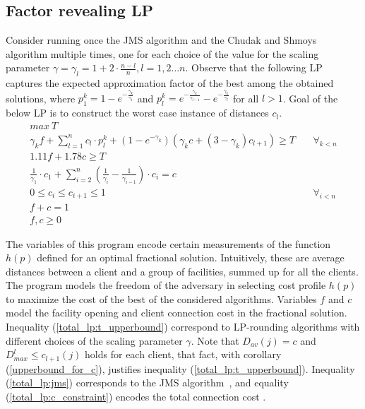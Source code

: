 \documentclass{llncs}
\begin{document}
 \subsection{Factor revealing LP}
 Consider running once the JMS algorithm and the Chudak and Shmoys algorithm multiple times, one for each choice of the value for the scaling parameter $\gamma = \gamma_l = 1 + 2 \cdot \frac{n - l}{n}, l=1, 2 \dots n$. Observe that the following LP captures the expected approximation factor of the best among the obtained solutions, where $p_1^k = 1 - e^{-\frac{\gamma_k}{\gamma_1}}$  and $p_l^k = e^{-\frac{\gamma_k}{\gamma_{l-1}}} - e^{-\frac{\gamma_k}{\gamma_l}}$ for all $l > 1$. Goal of the below LP is to construct the worst case instance of distances $c_l$.
 \begin{eqnarray}
  \label{total_lp:max}
  max~T && \\
\label{total_lp:t_upperbound}
  \gamma_k f + \sum_{l = 1}^{n} c_l \cdot p_l^k + (1 - e^{-\gamma_k}) (\gamma_k c + (3 - \gamma_k)c_{l+1}) \geq T &&  ~\forall_{k < n}\\
\label{total_lp:jms}
  1.11 f + 1.78 c \geq T && \\
\label{total_lp:c_constraint}
  \frac{1}{\gamma_1} \cdot c_1 + \sum_{i = 2}^{n}(\frac{1}{\gamma_i} - \frac{1}{\gamma_{i-1}}) \cdot c_i = c && \\
\label{total_lp:c_order}
  0 \leq c_i \leq c_{i+1} \leq 1&&~\forall_{i < n}\\
\label{total_lp:opt_sol}
  f + c = 1 && \\
f, c\geq 0 &&
\end{eqnarray}
 
The variables of this program encode certain measurements of the function $h(p)$ defined for an optimal fractional solution. Intuitively, these are average distances
between a client and a group of facilities, summed up for all the clients. 
The program models the freedom of the adversary in selecting cost profile $h(p)$ to maximize the cost of the best of the considered algorithms. 
Variables $f$ and $c$ model the facility opening and client connection cost in the fractional solution. Inequality (\ref{total_lp:t_upperbound}) correspond to 
LP-rounding algorithms with different choices of the scaling parameter $\gamma$. Note that $D_{av}(j) = c$ and $D_{max}^l \leq c_{l+1}(j)$ holds for each client, that fact, with corollary (\ref{upperbound_for_c}), justifies inequality (\ref{total_lp:t_upperbound}). Inequality (\ref{total_lp:jms}) corresponds to the JMS algorithm~\cite{Jain}, 
and equality (\ref{total_lp:c_constraint}) encodes the total connection cost
.
\end{document}
